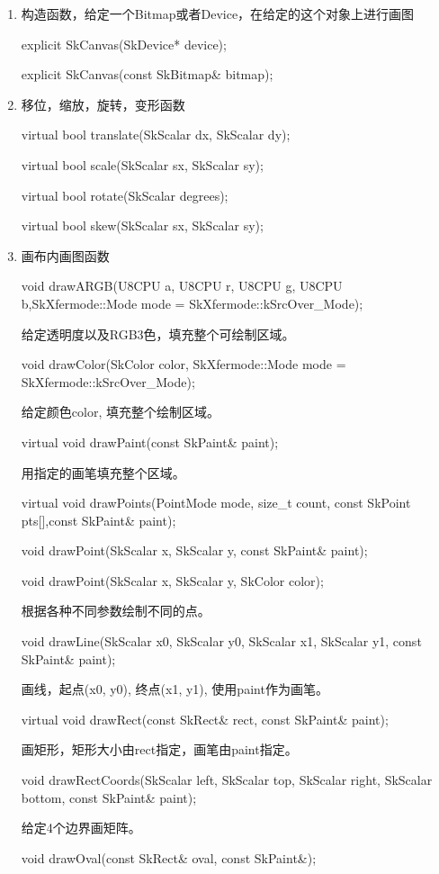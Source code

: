 \begin{enumerate}
	\item 构造函数，给定一个Bitmap或者Device，在给定的这个对象上进行画图

		explicit SkCanvas(SkDevice* device);

		explicit SkCanvas(const SkBitmap\&  bitmap);

	\item 移位，缩放，旋转，变形函数

		virtual bool translate(SkScalar dx, SkScalar dy);

		virtual bool scale(SkScalar sx, SkScalar sy);

		virtual bool rotate(SkScalar degrees);

		virtual bool skew(SkScalar sx, SkScalar sy);
	\item 画布内画图函数

		void drawARGB(U8CPU a, U8CPU r, U8CPU g, U8CPU b,SkXfermode::Mode mode = SkXfermode::kSrcOver\_Mode);

		给定透明度以及RGB3色，填充整个可绘制区域。

		void drawColor(SkColor color, SkXfermode::Mode mode = SkXfermode::kSrcOver\_Mode);

		给定颜色color, 填充整个绘制区域。

		virtual void drawPaint(const SkPaint\& paint);

		用指定的画笔填充整个区域。

		virtual void drawPoints(PointMode mode, size\_t count, const SkPoint pts[],const SkPaint\& paint);

	void drawPoint(SkScalar x, SkScalar y, const SkPaint\& paint);

	void drawPoint(SkScalar x, SkScalar y, SkColor color);

	根据各种不同参数绘制不同的点。

	void drawLine(SkScalar x0, SkScalar y0, SkScalar x1, SkScalar y1, const SkPaint\& paint);

	画线，起点(x0, y0), 终点(x1, y1), 使用paint作为画笔。

	virtual void drawRect(const SkRect\& rect, const SkPaint\& paint);

	画矩形，矩形大小由rect指定，画笔由paint指定。

	void drawRectCoords(SkScalar left, SkScalar top, SkScalar right, SkScalar bottom, const SkPaint\& paint);

	给定4个边界画矩阵。

	void drawOval(const SkRect\& oval, const SkPaint\&);


\end{enumerate}
